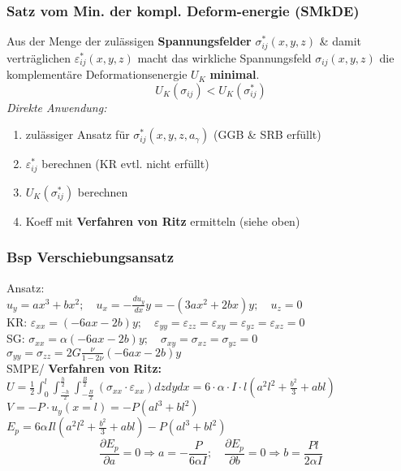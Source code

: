         \subsubsection{Satz vom Min. der kompl. Deform-energie (SMkDE)}
            Aus der Menge der zulässigen \textbf{Spannungsfelder} $\sigma_{ij}^*(x,y,z)$ \& damit verträglichen $\varepsilon_{ij}^*(x,y,z)$ macht das wirkliche Spannungsfeld $\sigma_{ij}(x,y,z)$ die komplementäre Deformationsenergie $U_K$ \textbf{minimal}. 
            \[U_K(\sigma_{ij}) < U_K(\sigma_{ij}^*)\]
            \textit{Direkte Anwendung:}
            \begin{enumerate}
                \item zulässiger Ansatz für $\sigma_{ij}^*(x,y,z,a_{\gamma})$ (GGB \& SRB erfüllt) 
                \item $\varepsilon_{ij}^*$ berechnen (KR evtl. nicht erfüllt)
                \item $U_K(\sigma_{ij}^*)$ berechnen
                \item Koeff mit \textbf{Verfahren von Ritz} ermitteln (siehe oben)
            \end{enumerate}
            
        \subsubsection{Bsp Verschiebungsansatz}
            Ansatz:\\
            $u_y=ax^3+bx^2; \quad u_x=-\frac{du_y}{dx}y= -(3ax^2+2bx)y; \quad u_z = 0$\\
            KR: $\varepsilon_{xx} =(-6ax-2b)y; \quad \varepsilon_{yy}=\varepsilon_{zz}=\varepsilon_{xy}=\varepsilon_{yz} = \varepsilon_{xz}=0$\\
            SG: $\sigma_{xx} = \alpha(-6ax-2b)y; \quad \sigma_{xy}=\sigma_{xz}=\sigma_{yz}=0$\\ $\sigma_{yy}=\sigma_{zz}=2G\frac{\nu}{1-2\nu}(-6ax-2b)y$\\
            SMPE/ \textbf{Verfahren von Ritz:}\\
            $U=\frac{1}{2}\int_0^l\int_\frac{-h}{2}^\frac{h}{2}\int_{-\frac{B}{2}}^\frac{B}{2}(\sigma_{xx}\cdot\varepsilon_{xx})dzdydx=6\cdot\alpha\cdot I\cdot l(a^2l^2+\frac{b^2}{3}+abl)$\\
            $V=-P\cdot u_y(x=l)=-P(al^3+bl^2)$\\
            $E_p=6\alpha Il(a^2l^2+\frac{b^2}{3}+abl)-P(al^3+bl^2)$
            \small\[\frac{\partial E_p}{\partial a} = 0 \Rightarrow a=-\frac{P}{6\alpha I};\quad\frac{\partial E_p}{\partial b} = 0 \Rightarrow b=\frac{Pl}{2\alpha I}\]\normalsize
